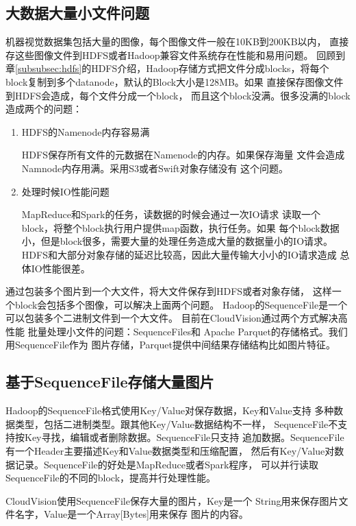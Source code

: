 \subsection{大数据大量小文件问题}
\label{subsec:big-data-small-files}
机器视觉数据集包括大量的图像，每个图像文件一般在10KB到200KB以内，
直接存这些图像文件到HDFS或者Hadoop兼容文件系统存在性能和易用问题。
回顾到章\ref{subsubsec:hdfs}的HDFS介绍，Hadoop存储方式把文件分成blocks，将每个
block复制到多个datanode，默认的Block大小是128MB。如果
直接保存图像文件到HDFS会造成，每个文件分成一个block，
而且这个block没满。很多没满的block造成两个的问题：
\begin{enumerate}
  \item HDFS的Namenode内存容易满

        HDFS保存所有文件的元数据在Namenode的内存。如果保存海量
        文件会造成Namnode内存用满。采用S3或者Swift对象存储没有
        这个问题。

  \item 处理时候IO性能问题
        
        MapReduce和Spark的任务，读数据的时候会通过一次IO请求
        读取一个block，将整个block执行用户提供map函数，执行任务。如果
        每个block数据小，但是block很多，需要大量的处理任务造成大量的数据量小的IO请求。
        HDFS和大部分对象存储的延迟比较高，因此大量传输大小小的IO请求造成
        总体IO性能很差。
\end{enumerate}


通过包装多个图片到一个大文件，将大文件保存到HDFS或者对象存储，
这样一个block会包括多个图像，可以解决上面两个问题。
Hadoop的SequenceFile是一个可以包装多个二进制文件到一个大文件。
目前在CloudVision通过两个方式解决高性能
批量处理小文件的问题：SequenceFiles和
Apache Parquet的存储格式。我们用SequenceFile作为
图片存储，Parquet提供中间结果存储结构比如图片特征。


\subsection{基于SequenceFile存储大量图片}
\label{subsec:seq-file}
Hadoop的SequenceFile格式使用Key/Value对保存数据，Key和Value支持
多种数据类型，包括二进制类型。跟其他Key/Value数据结构不一样，
SequenceFile不支持按Key寻找，编辑或者删除数据。SequenceFile只支持
追加数据。SequenceFile有一个Header主要描述Key和Value数据类型和压缩配置，
然后有Key/Value对数据记录。SequenceFile的好处是MapReduce或者Spark程序，
可以并行读取SequenceFile的不同的block，提高并行处理性能。

CloudVision使用SequenceFile保存大量的图片，Key是一个
String用来保存图片文件名字，Value是一个Array[Bytes]用来保存
图片的内容。

